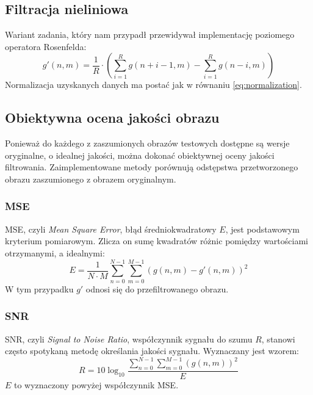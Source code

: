 \documentclass{classrep}
\begin{document}
\subsection{Filtracja nieliniowa}
\label{filter.nonlinear}
Wariant zadania, który nam przypadł przewidywał implementację poziomego operatora Rosenfelda:
\begin{equation}
 g'(n, m) = \frac{1}{R} \cdot \left( \displaystyle \sum \limits_{i=1}^R g\left(n + i - 1, m\right) - \displaystyle \sum \limits_{i=1}^R g\left(n - i, m\right) \right)
\end{equation}
Normalizacja uzyskanych danych ma postać jak w równaniu \ref{eq:normalization}.

\subsection{Obiektywna ocena jakości obrazu}
Ponieważ do każdego z zaszumionych obrazów testowych dostępne są wersje oryginalne, o idealnej jakości, można dokonać obiektywnej oceny jakości filtrowania. Zaimplementowane metody porównują odstępstwa przetworzonego obrazu zaszumionego z obrazem oryginalnym.

\subsubsection{MSE}
MSE, czyli \textit{Mean Square Error}, błąd średniokwadratowy $E$, jest podstawowym kryterium pomiarowym. Zlicza on sumę kwadratów różnic pomiędzy wartościami otrzymanymi, a idealnymi:
\begin{equation}
 E = \frac{1}{N \cdot M} \displaystyle \sum \limits_{n=0}^{N-1} \sum \limits_{m=0}^{M-1} \left(g\left(n, m\right) - g'\left(n, m\right) \right)^2
\end{equation}
W tym przypadku $g'$ odnosi się do przefiltrowanego obrazu.

\subsubsection{SNR}
SNR, czyli \textit{Signal to Noise Ratio}, współczynnik sygnału do szumu $R$, stanowi często spotykaną metodę określania jakości sygnału. Wyznaczany jest wzorem:
\begin{equation}
 R = 10 \log_{10} \frac{\displaystyle \sum \limits_{n=0}^{N-1} \sum \limits_{m=0}^{M-1} \left(g\left(n, m\right)\right)^2}{E}
\end{equation}
$E$ to wyznaczony powyżej współczynnik MSE.
\end{document}
